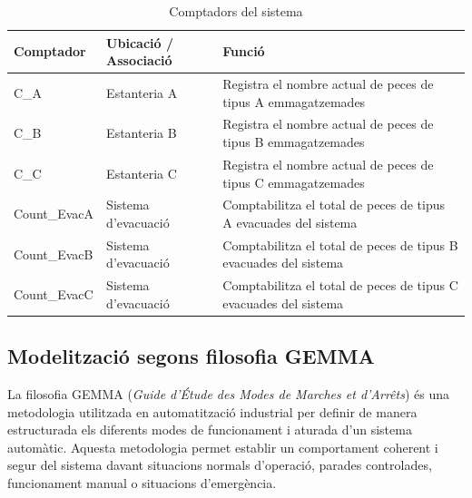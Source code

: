 \documentclass[a4paper,11pt,DIV=13,headings=normal,abstract=true,twoside=semi]{article}
\begin{document}
\begin{table}[H]
\centering
\small
\caption{Comptadors del sistema}
\label{tab:tab_comptadors}
\begin{tabular}{|p{3cm}|p{5cm}|p{6cm}|}
\hline
\textbf{Comptador} & \textbf{Ubicació / Associació} & \textbf{Funció} \\ \hline

C\_A & Estanteria A & Registra el nombre actual de peces de tipus A emmagatzemades \\ \hline

C\_B & Estanteria B & Registra el nombre actual de peces de tipus B emmagatzemades \\ \hline

C\_C & Estanteria C & Registra el nombre actual de peces de tipus C emmagatzemades \\ \hline

Count\_EvacA & Sistema d'evacuació & Comptabilitza el total de peces de tipus A evacuades del sistema \\ \hline

Count\_EvacB & Sistema d'evacuació & Comptabilitza el total de peces de tipus B evacuades del sistema \\ \hline

Count\_EvacC & Sistema d'evacuació & Comptabilitza el total de peces de tipus C evacuades del sistema \\ \hline

\end{tabular}

\end{table}

\subsection{Modelització segons filosofia GEMMA}

La filosofia GEMMA (\textit{Guide d'Étude des Modes de Marches et d'Arrêts}) és una metodologia utilitzada en automatització industrial per definir de manera estructurada els diferents modes de funcionament i aturada d'un sistema automàtic. Aquesta metodologia permet establir un comportament coherent i segur del sistema davant situacions normals d'operació, parades controlades, funcionament manual o situacions d'emergència.
\end{document}
